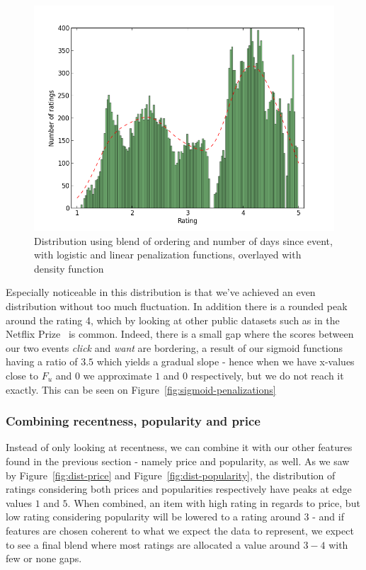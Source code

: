 \begin{figure}[H]
  \centering
  \includegraphics[scale=0.5]{image/dist-blend}
  \caption[Distribution using blend of ordering and number of days since event]{Distribution using blend of ordering and number of days since event,
  with logistic and linear penalization functions, overlayed with density
  function}
  \label{dist-blend}
\end{figure}

Especially noticeable in this distribution is that we've achieved an even
distribution without too much fluctuation. In addition there is a rounded peak
around the rating 4, which by looking at other public datasets such as in the
Netflix Prize~\cite{Netflix} is common. Indeed, there is a small gap where the
scores between our two events \textit{click} and \textit{want} are bordering, a
result of our sigmoid functions having a ratio of $3.5$ which yields a gradual
slope - hence when we have x-values close to $F_u$ and $0$ we approximate $1$
and $0$ respectively, but we do not reach it exactly. This can be seen on
Figure~\ref{fig:sigmoid-penalizations}

\subsubsection{Combining recentness, popularity and price}

Instead of only looking at recentness, we can combine it with our other
features found in the previous section - namely price and popularity, as well.
As we saw by Figure~\ref{fig:dist-price} and Figure~\ref{fig:dist-popularity}, the
distribution of ratings considering both prices and popularities respectively
have peaks at edge values $1$ and $5$. When combined, an item with high rating
in regards to price, but low rating considering popularity will be lowered to a
rating around $3$ - and if features are chosen coherent to what we expect the
data to represent, we expect to see a final blend where most ratings are
allocated a value around $3-4$ with few or none gaps.

